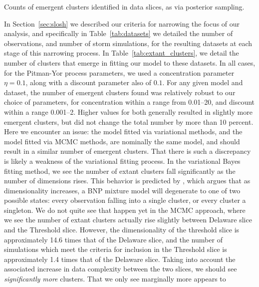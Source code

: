 \begin{table}[tb]
    \centering 
    
    \caption{Counts of emergent clusters identified in data slices, as via posterior sampling.\label{tab:extant_clusters}}
\end{table}

In Section~\ref{sec:slosh} we described our criteria for narrowing the focus of our analysis,
    and specifically in Table~\ref{tab:datasets} we detailed the number of observations, and
    number of storm simulations, for the resulting datasets at each stage of this narrowing
    process.  In Table~\ref{tab:extant_clusters}, we detail the number of clusters that emerge
    in fitting our model to these datasets.  In all cases, for the Pitman-Yor process parameters,
    we used a concentration parameter $\eta = 0.1$, along with a discount parameter also of $0.1$.
    For any given model and dataset, the number of emergent clusters found was relatively robust 
    to our choice of parameters, for concentration within a range from \num{0.01}--\num{20}, and
    discount within a range \num{0.001}--\num{2}.  Higher values for both generally resulted in
    slightly more emergent clusters, but did not change the total number by more than \num{10} percent.
    Here we encounter an issue:  the model fitted via variational methods, and the model fitted 
    via MCMC methods, are nominally the same model, and should result in a similar number of 
    emergent clusters. That there is such a discrepancy is likely a weakness of the variational
    fitting process.  In the variational Bayes fitting method, we see the number of extant
    clusters fall significantly as the number of dimensions rises.  This behavior is predicted 
    by \cite{chandra2023}, which argues that as dimensionality increases, a BNP mixture model 
    will degenerate to one of two possible states: every observation falling into a single 
    cluster, or every cluster a singleton. We do not quite see that happen yet in the MCMC approach,
    where we see the number of extant clusters actually rise slightly between Delaware slice 
    and the Threshold slice.  However, the dimensionality of the threshold slice is approximately
    14.6 times that of the Delaware slice, and the number of simulations which meet the criteria
    for inclusion in the Threshold slice is approximately 1.4 times that of the Delaware slice.
    Taking into account the associated increase in data complexity between the two slices, we
    should see \emph{significantly more} clusters.  That we only see marginally more appears to
